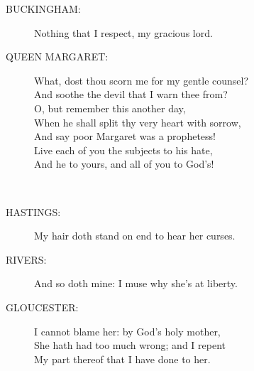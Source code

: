 \documentclass{article}
\begin{document}
\begin{description}
\item[BUCKINGHAM:] 
\hspace{1pt}Nothing that I respect, my gracious lord.\\
\end{description}
\begin{description}
\item[QUEEN MARGARET:] 
\hspace{1pt}What, dost thou scorn me for my gentle counsel?\\
\hspace{1pt}And soothe the devil that I warn thee from?\\
\hspace{1pt}O, but remember this another day,\\
\hspace{1pt}When he shall split thy very heart with sorrow,\\
\hspace{1pt}And say poor Margaret was a prophetess!\\
\hspace{1pt}Live each of you the subjects to his hate,\\
\hspace{1pt}And he to yours, and all of you to God's!\\
\end{description}
\centering{\it [Exit]}\\
\begin{description}
\item[HASTINGS:] 
\hspace{1pt}My hair doth stand on end to hear her curses.\\
\end{description}
\begin{description}
\item[RIVERS:] 
\hspace{1pt}And so doth mine: I muse why she's at liberty.\\
\end{description}
\begin{description}
\item[GLOUCESTER:] 
\hspace{1pt}I cannot blame her: by God's holy mother,\\
\hspace{1pt}She hath had too much wrong; and I repent\\
\hspace{1pt}My part thereof that I have done to her.\\
\end{description}
\end{document}
